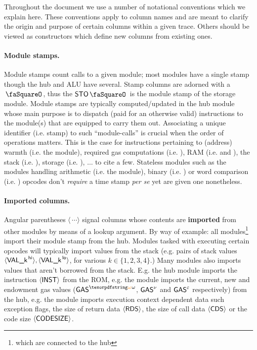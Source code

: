Throughout the document we use a number of notational conventions which we explain here. These conventions apply to column names and are meant to clarify the origin and purpose of certain columns within a given trace. Others should be viewed as constructors which define new columns from existing ones.

\paragraph{Module stamps.} Module stamps count calls to a given module; most modules have a single stamp though the hub and ALU have several. Stamp columns are adorned with a $\stamp$, thus the $\stoStamp$ is the module stamp of the storage module. Module stamps are typically computed/updated in the hub module whose main purpose is to dispatch (paid for an otherwise valid) instructions to the module(s) that are equipped to carry them out. Associating a unique identifier (i.e. stamp) to such ``module-calls'' is crucial when the order of operations matters. This is the case for instructions pertaining to (address) warmth (i.e. the \wrmMod{} module), required gas computations (i.e. \gasMod{}), RAM (i.e. \mmuMod{} and \ramMod{}), the stack (i.e. \hubMod{}), storage (i.e. \stoMod{}), $\dots{}$ to cite a few. Stateless modules such as the modules handling arithmetic (i.e. the \aluMod{} module), binary (i.e. \binMod{}) or word comparison (i.e. \wcpMod{}) opcodes don't \emph{require} a time stamp \emph{per se} yet are given one nonetheless.

\paragraph{Imported columns.} Angular parentheses $\langle\,\cdots\rangle$
signal columns whose contents are \textbf{imported} from other modules by
means of a lookup argument. By way of example: all
modules\footnote{which are connected to the hub} import their module stamp from the hub. 
Modules tasked with executing certain opcodes will typically import values from the stack
(e.g. pairs of stack values $\langle{}{{\textsf{VAL\_k}}^{\mathsf{\,hi}}}\rangle{}, \langle{}{{\textsf{VAL\_k}}^{\mathsf{\,lo}}}\rangle{}$, for various $k\in\{1,2,3,4\}$.)
Many modules also imports values that aren't borrowed from the stack.
E.g. the hub module imports the instruction $\langle{}\textsf{INST}\rangle{}{}$ from the ROM,
e.g. the \gasMod{} module imports the current, new and endowment gas values
($\gasCur$, $\textsf{GAS}^{\nu}$  and $\textsf{GAS}^\varepsilon$ respectively) from the hub, e.g. the \oobMod{}
module imports execution context dependent data such exception flags,
the size of return data $\langle{}\textsf{RDS}\rangle{}{}$, the size of call data $\langle{}\textsf{CDS}\rangle{}$ or the code
size $\langle{}\textsf{CODESIZE}\rangle{}$.

